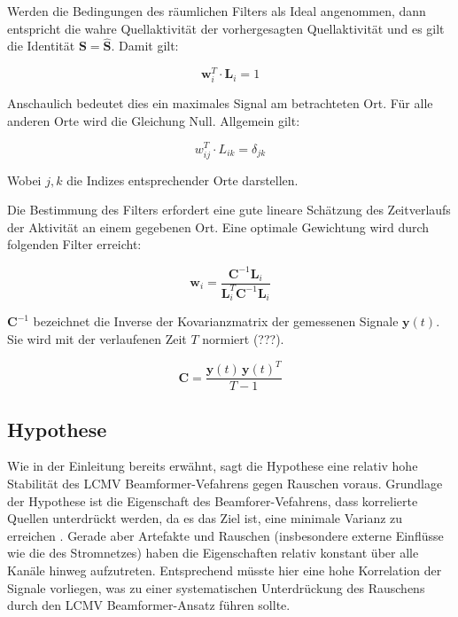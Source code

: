 \documentclass[doc,a4paper,12pt]{apa6}
\newcommand{\mx}[1]{\mathbf{#1}}
\begin{document}
Werden die Bedingungen des räumlichen Filters als Ideal angenommen, dann entspricht die wahre Quellaktivität der vorhergesagten Quellaktivität und es gilt die Identität $\mx{S} = \mx{\hat S}$. Damit gilt:

\begin{equation}
\mx{w}_i^T \cdot \mx{L}_i = 1
\end{equation}

Anschaulich bedeutet dies ein maximales Signal am betrachteten Ort. Für alle anderen Orte wird die Gleichung Null. Allgemein gilt:

\begin{equation}
w^T_{ij} \cdot L_{ik} = \delta_{jk}
\end{equation}

Wobei $j,k$ die Indizes entsprechender Orte darstellen.

Die Bestimmung des Filters erfordert eine gute lineare Schätzung des Zeitverlaufs der Aktivität an einem gegebenen Ort. Eine optimale Gewichtung \parencite[z.B.][]{haykin2008adaptive} wird durch folgenden Filter erreicht:

\begin{equation}
\mx{w}_i = \frac{\mx{C}^{-1} \mx{L}_i}{\mx{L}^T_i \mx{C}^{-1} \mx{L}_i}
\end{equation}

$\mx{C}^{-1}$ bezeichnet die Inverse der Kovarianzmatrix der gemessenen Signale $\mx{y}(t)$. Sie wird mit der verlaufenen Zeit $T$ normiert (???).

\begin{equation}
\mx{C} = \frac{\mx{y}(t)\,\mx{y}(t)^T}{T-1}
\end{equation}

\subsection{Hypothese}
\label{sec:hypo}

Wie in der Einleitung bereits erwähnt, sagt die Hypothese eine relativ hohe Stabilität des LCMV Beamformer-Vefahrens gegen Rauschen voraus. Grundlage der Hypothese ist die Eigenschaft des Beamforer-Vefahrens, dass korrelierte Quellen unterdrückt werden, da es das Ziel ist, eine minimale Varianz zu erreichen \parencite{van1997localization}. Gerade aber Artefakte und Rauschen (insbesondere externe Einflüsse wie die des Stromnetzes) haben die Eigenschaften relativ konstant über alle Kanäle hinweg aufzutreten. Entsprechend müsste hier eine hohe Korrelation der Signale vorliegen, was zu einer systematischen Unterdrückung des Rauschens durch den LCMV Beamformer-Ansatz führen sollte.
\end{document}
